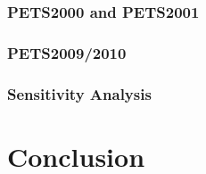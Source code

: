 \documentclass[twocolumn, final]{svjour3}
\begin{document}
\subsubsection{PETS2000 and PETS2001}
\label{sec:pets2000and2001}

\subsubsection{PETS2009/2010}
\label{sec:pets20092010}

\subsubsection{Sensitivity Analysis}
\label{sec:sensitivityanalysis}




\section{Conclusion}
\label{sec:conclusion}



\begin{small}

 
\end{small}
\end{document}
